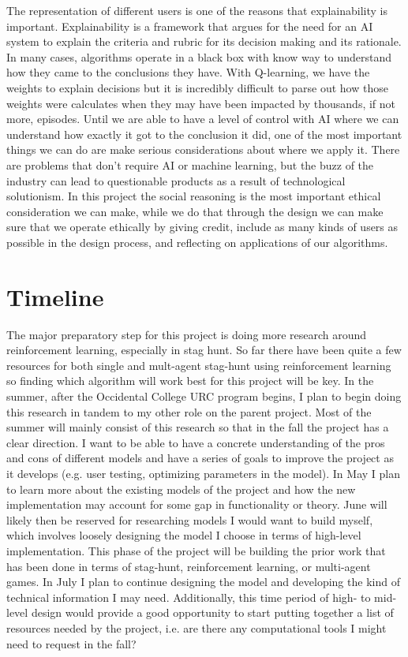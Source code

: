 \documentclass[10pt,twocolumn]{article}
\begin{document}
The representation of different users is one of the reasons that explainability is important.
Explainability is a framework that argues for the need for an AI system to explain the criteria and rubric for its decision making and its rationale.
In many cases, algorithms operate in a black box with know way to understand how they came to the conclusions they have.
With Q-learning, we have the weights to explain decisions but it is incredibly difficult to parse out how those weights were calculates when they may have been impacted by thousands, if not more, episodes.
Until we are able to have a level of control with AI where we can understand how exactly it got to the conclusion it did, one of the most important things we can do are make serious considerations about where we apply it.
There are problems that don't require AI or machine learning, but the buzz of the industry can lead to questionable products as a result of technological solutionism.
In this project the social reasoning is the most important ethical consideration we can make, while we do that through the design we can make sure that we operate ethically by giving credit, include as many kinds of users as possible in the design process, and reflecting on applications of our algorithms.

\section{Timeline}

The major preparatory step for this project is doing more research around reinforcement learning, especially in stag hunt.
So far there have been quite a few resources for both single and mult-agent stag-hunt using reinforcement learning so finding which algorithm will work best for this project will be key.
In the summer, after the Occidental College URC program begins, I plan to begin doing this research in tandem to my other role on the parent project.
Most of the summer will mainly consist of this research so that in the fall the project has a clear direction.
I want to be able to have a concrete understanding of the pros and cons of different models and have a series of goals to improve the project as it develops (e.g. user testing, optimizing parameters in the model).
In May I plan to learn more about the existing models of the project and how the new implementation may account for some gap in functionality or theory.
June will likely then be reserved for researching models I would want to build myself, which involves loosely designing the model I choose in terms of high-level implementation.
This phase of the project will be building the prior work that has been done in terms of stag-hunt, reinforcement learning, or multi-agent games.
In July I plan to continue designing the model and developing the kind of technical information I may need.
Additionally, this time period of high- to mid-level design would provide a good opportunity to start putting together a list of resources needed by the project, i.e. are there any computational tools I might need to request in the fall?
\end{document}
